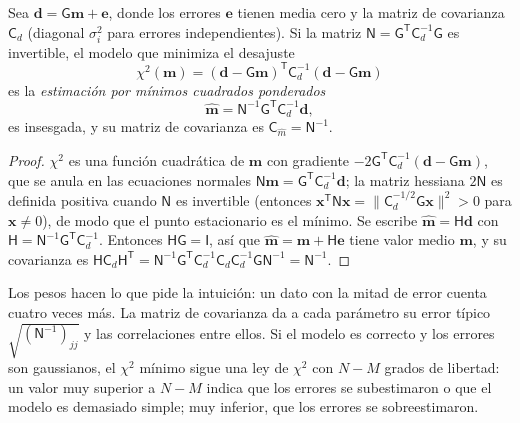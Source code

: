\begin{theorem}\label{thm:b3:seismology-imaging:wls}
Sea $\mathbf d = \mathsf G\mathbf m + \mathbf e$, donde los errores $\mathbf e$
tienen media cero y la matriz de covarianza $\mathsf C_d$ (diagonal
$\sigma_i^2$ para errores independientes). Si la matriz
$\mathsf N = \mathsf G^{\mathsf T}\mathsf C_d^{-1}\mathsf G$ es invertible, el
modelo que minimiza el desajuste
\[
  \chi^2(\mathbf m) = (\mathbf d - \mathsf G\mathbf m)^{\mathsf T}\mathsf C_d^{-1}
  (\mathbf d - \mathsf G\mathbf m)
\]
es la \emph{estimación por mínimos cuadrados ponderados}
\[
  \hat{\mathbf m} = \mathsf N^{-1}\mathsf G^{\mathsf T}\mathsf C_d^{-1}\mathbf d ,
\]
es insesgada, y su matriz de covarianza es
$\mathsf C_{\hat m} = \mathsf N^{-1}$.
\end{theorem}

\begin{proof}
$\chi^2$ es una función cuadrática de $\mathbf m$ con gradiente
$-2\mathsf G^{\mathsf T}\mathsf C_d^{-1}(\mathbf d - \mathsf G\mathbf m)$, que
se anula en las ecuaciones normales $\mathsf N\mathbf m = \mathsf G^{\mathsf T}
\mathsf C_d^{-1}\mathbf d$; la matriz hessiana $2\mathsf N$ es definida positiva cuando
$\mathsf N$ es invertible (entonces $\mathbf x^{\mathsf T}\mathsf N\mathbf x =
\|\mathsf C_d^{-1/2}\mathsf G\mathbf x\|^2 > 0$ para $\mathbf x \ne 0$), de modo que el
punto estacionario es el mínimo. Se escribe $\hat{\mathbf m} = \mathsf H\mathbf d$ con
$\mathsf H = \mathsf N^{-1}\mathsf G^{\mathsf T}\mathsf C_d^{-1}$. Entonces
$\mathsf H\mathsf G = \mathsf I$, así que $\hat{\mathbf m} = \mathbf m + \mathsf H\mathbf e$
tiene valor medio $\mathbf m$, y su covarianza es
$\mathsf H\mathsf C_d\mathsf H^{\mathsf T} =
\mathsf N^{-1}\mathsf G^{\mathsf T}\mathsf C_d^{-1}\mathsf C_d\mathsf C_d^{-1}
\mathsf G\mathsf N^{-1} = \mathsf N^{-1}$.
\end{proof}

Los pesos hacen lo que pide la intuición: un dato con la mitad de error cuenta
cuatro veces más. La matriz de covarianza da a cada parámetro su error típico
$\sqrt{(\mathsf N^{-1})_{jj}}$ y las correlaciones entre ellos. Si el modelo
es correcto y los errores son gaussianos, el $\chi^2$ mínimo sigue una ley de
$\chi^2$ con $N - M$ grados de libertad: un valor muy superior a $N - M$ indica que
los errores se subestimaron o que el modelo es demasiado simple; muy inferior, que
los errores se sobreestimaron.

